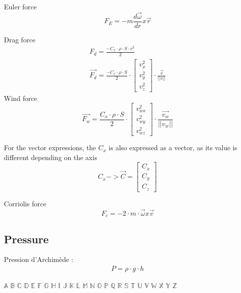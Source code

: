 	Euler force
	\begin{equation}
		F_E = - m \frac{d\vec{\omega}}{dr} x \vec{r}
	\end{equation}
	
	Drag force
	\begin{eqnarray}
		F_d = \frac{- C_x \cdot \rho \cdot S \cdot v^2}{2}\\
		\vec{F_d} = \frac{- C_x \cdot \rho \cdot S}{2} \cdot \begin{bmatrix}
			v_{x}^2\\
			v_{y}^2 \\
			v_{z}^2
		\end{bmatrix}\cdot \frac{\vec{v}}{||v||} 
	\end{eqnarray}
	Wind force
	\begin{equation}
		\vec{F_w} = \frac{C_x \cdot \rho \cdot S}{2} \cdot \begin{bmatrix}
			v_{wx}^2\\
			v_{wy}^2 \\
			v_{wz}^2
		\end{bmatrix}\cdot \frac{\vec{v_w}}{||v_w||} 
	\end{equation}
	
	For the vector expressions, the $C_x$ is also expressed as a vector, as its value is different depending on the axis
	\begin{equation}
		C_x -> \vec{C} = \begin{bmatrix}
			C_x\\
			C_y \\
			C_z
		\end{bmatrix}
	\end{equation}
	
	Corriolis force
	\begin{equation}
		F_c = - 2 \cdot m \cdot \vec{\omega} x \vec{v} 
	\end{equation}
	\subsection{Pressure}
	Pression d'Archimède :
	\begin{eqnarray}
	P=\rho \cdot g \cdot h
	\end{eqnarray}
	
	$\mathbb{A}$
	$\mathbb{B}$
	$\mathbb{C}$
	$\mathbb{D}$
	$\mathbb{E}$
	$\mathbb{F}$
	$\mathbb{G}$
	$\mathbb{H}$
	$\mathbb{I}$
	$\mathbb{J}$
	$\mathbb{K}$
	$\mathbb{L}$
	$\mathbb{M}$
	$\mathbb{N}$
	$\mathbb{O}$
	$\mathbb{P}$
	$\mathbb{Q}$
	$\mathbb{R}$
	$\mathbb{S}$
	$\mathbb{T}$
	$\mathbb{U}$
	$\mathbb{V}$
	$\mathbb{W}$
	$\mathbb{X}$
	$\mathbb{Y}$
	$\mathbb{Z}$
	
